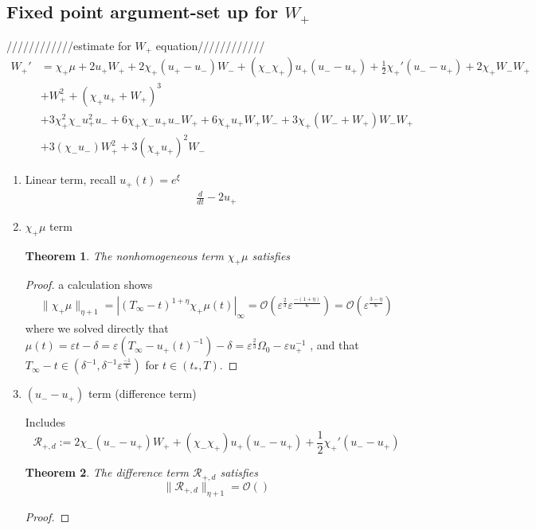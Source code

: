 \documentclass[letterpaper,11pt]{article}
\newcommand{\rmO}{\mathcal{O}}
\newcommand{\eps}{\varepsilon}
\numberwithin{equation}{section}
\theoremstyle{plain}
\newtheorem{theorem}{Theorem}[section]
\begin{document}
\begin{enumerate}
\begin{itemize}
\subsection{Fixed point argument-set up for $W_+$}
////////////estimate for $W_+$ equation////////////
\begin{align*}
W_+'  &=  \chi_+\mu+2u_+W_+ + 2\chi_+(u_+ -u_-)W_-+ (\chi_-\chi_+) u_+(u_- -u_+)+\frac{1}{2}\chi_+'(u_- -u_+) +2\chi_+W_-W_+\\
&+W_+^2+ (\chi_+u_+ + W_+)^3 \\
&+ 3\chi_+^2\chi_-u_+^2u_- + 6\chi_+\chi_- u_+u_- W_+ +6 \chi_+u_+W_+W_- +3\chi_+(W_-+W_+)W_-W_+\\
&+3(\chi_-u_-)W_+^2 + 3(\chi_+u_+)^2W_-
\end{align*}

\begin{enumerate}
\item Linear term, recall $u_+(t) = e^\xi$
\begin{align*}
\frac{d}{dt} - 2u_+
\end{align*}

\item  $\chi_+\mu$ term
\begin{theorem}
The nonhomogeneous term $\chi_+ \mu$ satisfies
\end{theorem}

\begin{proof}a calculation shows
\begin{align*}
\|\chi_+ \mu \|_{\eta+1} = |(T_\infty -t)^{1+\eta}\chi_+\mu(t) |_\infty  = \rmO( \eps^{\frac{2}{3}} \eps^{\frac{-(1+\eta)}{6}} ) = \rmO(\eps^{\frac{3-\eta}{6}} )
\end{align*}
where we solved directly that $\mu(t) = \eps t -\delta = \eps(T_\infty - u_+(t)^{-1})-\delta= \eps^{\frac{2}{3}}\Omega_0 - \eps u_+^{-1}$ , and that $T_\infty - t \in (\delta^{-1},\delta^{-1}\eps^{\frac{-1}{6}})$ for $t \in (t_*,T)$.
\end{proof}
\item $(u_- - u_+)$ term (difference term)

Includes
\[
\mathcal{R}_{+,d} := 2\chi_-(u_- - u_+)W_+ + (\chi_-\chi_+)u_+(u_- - u_+) + \frac{1}{2}\chi_+'(u_- - u_+)
\]

\begin{theorem}
The difference term $\mathcal{R}_{+,d}$ satisfies
\[
\|\mathcal{R}_{+,d} \|_{\eta+1}  = \rmO()
\]
\end{theorem}

\begin{proof}


\end{proof}
\end{enumerate}
\end{itemize}
\end{enumerate}
\end{document}
